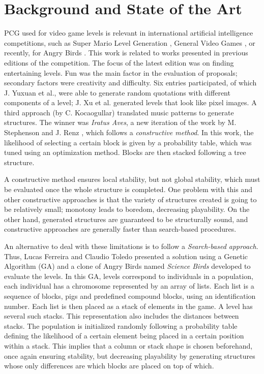 \documentclass[a4paper,twoside]{article}
\begin{document}
\section{Background and State of the Art}
\label{sec:soa}

PCG used for video game levels is relevant in international artificial
intelligence competitions, such as Super Mario Level Generation
\cite{MarioAI_Level_12}, General Video Games
\cite{GAIG_LevelGeneration_18,Khalifa_GVGLG_16}, or recently, for
Angry Birds \cite{AngryBirds_LevelGeneration_18}. This work is related
to works presented in previous editions of the competition.  The focus
of the latest edition \cite{AngryBirds_LevelGeneration_18} was on
finding entertaining levels. Fun was the main factor in the evaluation
of proposals; secondary factors were creativity and difficulty.  Six
entries participated, of which J. Yuxuan et al., were able to generate
random quotations with different components of a level; J. Xu et
al. generated levels that look like pixel images. A third approach (by
C. Kocaogullar) translated music patterns to generate structures. The
winner was {\em Iratus Aves}, a new iteration of the work by M. Stephenson
and J. Renz \cite{stephenson2017generating,stephenson2016procedural},
which follows a \textit{constructive method}. In this work, the
likelihood of selecting a certain block is given by a probability
table, which was tuned using an optimization method. Blocks are then
stacked following a tree structure.

A constructive method ensures local stability, but not global
stability, which must be evaluated once the whole structure is
completed. One problem with this and other constructive approaches is
that the variety of structures created is going to be relatively
small; monotony leads to boredom, decreasing playability. On the other
hand, generated structures are guaranteed to be structurally sound,
and constructive approaches are generally faster than search-based
procedures. 


An alternative to deal with these limitations is to follow a
\textit{Search-based approach}. Thus, Lucas Ferreira and Claudio
Toledo \cite{ferreira2014search} presented a solution using a Genetic
Algorithm (GA) and a clone of Angry Birds named \textit{Science Birds} developed
to evaluate the levels. In this GA, levels correspond to
individuals in a population, each individual has a chromosome
represented by an array of lists. Each list is a sequence of blocks,
pigs and predefined compound blocks, using an identification
number. Each list is then placed as a stack of elements in the game. A
level has several such stacks. This representation also includes the
distances between stacks. The population is initialized randomly
following a probability table defining the likelihood of a certain
element being placed in a certain position within a stack. This
implies that a column or stack shape is chosen beforehand, once again
ensuring stability, but decreasing playability by generating
structures whose only differences are which blocks are placed on top
of which. 
\end{document}
